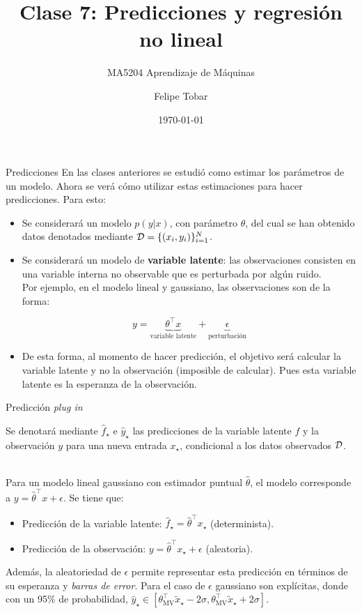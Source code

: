 \documentclass[9pt, handout]{beamer}
\title{Clase 7: Predicciones y regresión no lineal}
\subtitle{MA5204 Aprendizaje de Máquinas}
\date{\today}
\author{Felipe Tobar}
\institute{Department of Mathematical Engineering \&\\ Center for Mathematical Modelling\\Universidad de Chile}
\begin{document}
\begin{frame}
  \titlepage
\end{frame}

\begin{frame}{Predicciones}
	En las clases anteriores se estudió como estimar los parámetros de un modelo. Ahora se verá cómo utilizar estas estimaciones para hacer predicciones. Para esto:
	
	\begin{itemize}
		\item Se considerará un modelo $p(y|x)$, con parámetro $\theta$, del cual se han obtenido datos denotados mediante ${\mathcal D} = \{(x_i,y_i)\}_{i=1}^N$.\pause
		\item Se considerará un modelo de \textbf{variable latente}: las observaciones consisten en una variable interna no observable que es perturbada por algún ruido. \\
		Por ejemplo, en el modelo lineal y gaussiano, las observaciones son de la forma:

			\begin{equation*}
				y= \underbrace{\theta^\top x}_{\text{variable latente}} + \underbrace{\epsilon}_{\text{perturbación}}
			\end{equation*}\pause
		\item De esta forma, al momento de hacer predicción, el objetivo será calcular la variable latente y no la observación (imposible de calcular). Pues esta variable latente es la esperanza de la observación.
	\end{itemize}
	
\end{frame}

\begin{frame}{Predicción \emph{plug in}}

Se denotará mediante $\hat f_\star$ e $\hat y_\star$ las predicciones de la variable latente $f$ y la observación $y$ para una nueva entrada $x_\star$, condicional a los datos observados ${\mathcal D}$.\\~\ \pause

Para un modelo lineal gaussiano con estimador puntual $\hat{\theta}$, el modelo corresponde a $y=\hat{\theta}^\top x + \epsilon$. \pause Se tiene que:

\begin{itemize}
	\item Predicción de la variable latente: $\hat f_\star=\hat{\theta}^\top x_\star$ (determinista).\pause
	\item Predicción de la observación: $y=\hat{\theta}^\top x_\star + \epsilon$ (aleatoria).\pause
\end{itemize}
\vspace{1em}
Además, la aleatoriedad de $\epsilon$ permite representar esta predicción en términos de su esperanza y \emph{barras de error}. Para el caso de $\epsilon$ gaussiano son explícitas, donde con un 95\% de probabilidad, $\hat y_\star\in[\theta_{\text{MV}}^\top \tilde{x}_\star - 2\sigma,\theta_{\text{MV}}^\top \tilde{x}_\star + 2\sigma]$.
	
\end{frame}
\end{document}
